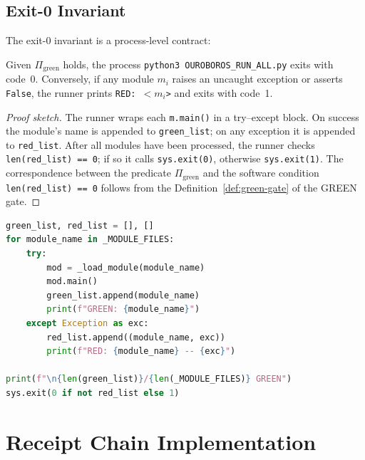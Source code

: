 \subsection{Exit-0 Invariant}
\label{ssec:exit0}

The exit-0 invariant is a process-level contract:

\begin{theorem}
  \label{thm:exit0}
  Given \(\Pi_{\mathrm{green}}\) holds, the process
  \texttt{python3 OUROBOROS\_RUN\_ALL.py} exits with code~0.
  Conversely, if any module \(m_i\) raises an uncaught exception or
  asserts \texttt{False}, the runner prints
  \texttt{RED: \(<m_i\)\texttt{>}} and exits with code~1.
\end{theorem}

\begin{proof}[Proof sketch]
  The runner wraps each \texttt{m.main()} in a try--except block.  On
  success the module's name is appended to \texttt{green\_list}; on any
  exception it is appended to \texttt{red\_list}.  After all modules have
  been processed, the runner checks \texttt{len(red\_list) == 0}; if so
  it calls \texttt{sys.exit(0)}, otherwise \texttt{sys.exit(1)}.  The
  correspondence between the predicate \(\Pi_{\mathrm{green}}\) and the
  software condition \texttt{len(red\_list) == 0} follows from the
  Definition~\ref{def:green-gate} of the GREEN gate.
\end{proof}

\begin{lstlisting}[language=Python, caption={Runner exit logic},
  label={lst:runner-exit}]
green_list, red_list = [], []
for module_name in _MODULE_FILES:
    try:
        mod = _load_module(module_name)
        mod.main()
        green_list.append(module_name)
        print(f"GREEN: {module_name}")
    except Exception as exc:
        red_list.append((module_name, exc))
        print(f"RED: {module_name} -- {exc}")

print(f"\n{len(green_list)}/{len(_MODULE_FILES)} GREEN")
sys.exit(0 if not red_list else 1)
\end{lstlisting}

\section{Receipt Chain Implementation}
\label{sec:receipt-chain-impl}

